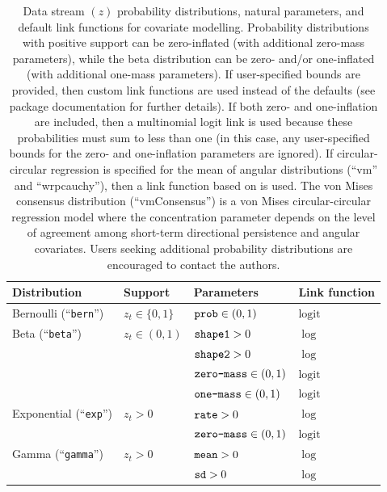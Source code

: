 \documentclass[12pt]{article}\usepackage[]{graphicx}\usepackage[]{color}
\begin{document}
\begin{table}
  \caption{\label{tab:pdfs} Data stream $(z)$ probability distributions, natural parameters, and default link functions for covariate modelling. Probability distributions with positive support can be zero-inflated (with additional zero-mass parameters), while the beta distribution can be zero- and/or one-inflated (with additional one-mass parameters). If user-specified bounds are provided, then custom link functions are used instead of the defaults (see package documentation for further details). If both zero- and one-inflation are included, then a multinomial logit link is used because these probabilities must sum to less than one (in this case, any user-specified bounds for the zero- and one-inflation parameters are ignored). If circular-circular regression is specified for the mean of angular distributions (``vm'' and ``wrpcauchy''), then a link function based on \cite{RivestEtAl2016} is used. The von Mises consensus distribution (``vmConsensus'') is a von Mises circular-circular regression model where the concentration parameter depends on the level of agreement among short-term directional persistence and angular covariates. Users seeking additional probability distributions are encouraged to contact the authors.}
  \begin{tabular}{llll}
  \toprule
  Distribution & Support & Parameters & Link function\footnotemark \tabularnewline
  \midrule
  Bernoulli (``\verb|bern|'')                 & $z_t\in\{0,1\}$          & $\verb|prob|\in(0,1)$            &  $\text{logit}$ \tabularnewline  
  Beta (``\verb|beta|'')                      & $z_t\in(0,1)$            & $\verb|shape1|>0$                &  $\log$ \tabularnewline  
                                              &                          & $\verb|shape2|>0$                &  $\log$ \tabularnewline
                                              &                          & $\verb|zero-mass|\in(0,1)$       &  $\text{logit}$ \tabularnewline 
                                              &                          & $\verb|one-mass|\in(0,1)$        &  $\text{logit}$ \tabularnewline 
  Exponential (``\verb|exp|'')                & $z_t>0$                  & $\verb|rate|>0$                  &  $\log$ \tabularnewline  
                                              &                          & $\verb|zero-mass|\in(0,1)$       &  $\text{logit}$ \tabularnewline 
  Gamma (``\verb|gamma|'')                    & $z_t>0$                  & $\verb|mean|>0$                  &  $\log$ \tabularnewline  
                                              &                          & $\verb|sd|>0$                    &  $\log$ \tabularnewline  

\end{tabular}
\end{table}
\end{document}
